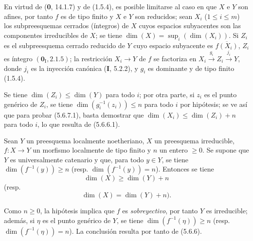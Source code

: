 En virtud de (\textbf 0, 14.1.7) y de (1.5.4), es posible limitarse al caso en que $X$ e
$Y$ son afines, por tanto $f$ es de tipo finito y $X$ e $Y$ son reducidos;
sean $X_i$ ($1\leq i\leq m$) los subpreesquemas cerrados (íntegros) de $X$
cuyos espacios subyacentes son las componentes irreducibles de $X$; se tiene
$\dim(X)=\sup_i(\dim(X_i))$. Si $Z_i$ es el subpreesquema cerrado reducido de
$Y$ cuyo espacio subyacente es $\overline{f(X_i)}$, $Z_i$ es íntegro
$(\mathbf{0}_{\mathrm I},2.1.5)$; la restricción $X_i\to Y$ de $f$ se factoriza en
$X_i\xrightarrow{g_i}Z_i\xrightarrow{j_i}Y$, donde $j_i$ es la inyección
canónica (\textbf I, 5.2.2), y $g_i$ es dominante
y de tipo finito (1.5.4).

Se tiene $\dim(Z_i)\leq\dim(Y)$ para todo $i$; por otra parte, si $z_i$ es
el punto genérico de $Z_i$, se tiene $\dim(g_i^{-1}(z_i))\leq n$ para
todo $i$ por hipótesis; se ve así que para probar (5.6.7.1), basta demostrar
que $\dim(X_i)\leq\dim(Z_i)+n$ para todo $i$, lo que resulta de (5.6.6.1).

\begin{corollary}[5.6.8]
\label{IV.2.s5.6.8-fr}
Sean $Y$ un preesquema localmente noetheriano, $X$ un preesquema
\textup{irreducible}, $f:X\to Y$ un morfismo localmente de tipo finito y $n$ un entero
$\geq0$. Se supone que $Y$ es universalmente catenario y que, para todo
$y\in Y$, se tiene $\dim(f^{-1}(y))\geq n$ \textup{(resp.}
$\dim(f^{-1}(y))=n$\textup{)}. Entonces se tiene
\begin{equation}
\dim(X)\geq\dim(Y)+n
\tag{5.6.8.1}\label{IV.2.s5.6.8.1-fr}
\end{equation}
\textup{(resp.}
\begin{equation}
\dim(X)=\dim(Y)+n).
\tag{5.6.8.2}\label{IV.2.s5.6.8.2-fr}
\end{equation}
\end{corollary}

Como $n\geq0$, la hipótesis implica que $f$ es \emph{sobreyectivo}, por tanto $Y$
es irreducible; además, si $\eta$ es el punto genérico de $Y$, se tiene
$\dim(f^{-1}(\eta))\geq n$ (resp. $\dim(f^{-1}(\eta))=n$). La conclusión
resulta por tanto de (5.6.6).
